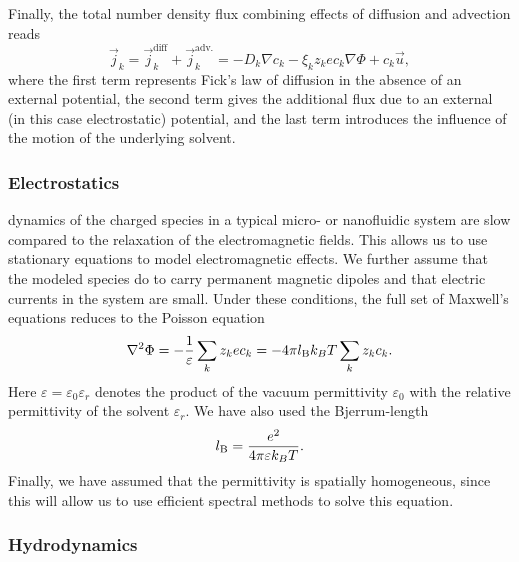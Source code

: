 Finally, the total number density flux combining effects of diffusion and advection reads
%
\begin{equation}
\label{eq:model_fluxes}
\vec{j}_{k} = \vec{j}_{k}^{\mathrm{diff}} + \vec{j}_{k}^{\mathrm{adv.}} = -D_{k} \nabla c_{k} - \xi_{k} z_{k} e c_{k} \nabla \Phi + c_{k} \vec{u} , 
\end{equation}
%
where the first term represents Fick's law of diffusion in the absence of an external potential, the second term gives the additional flux due to an external (in this case electrostatic) potential, and the last term introduces the influence of the motion of the underlying solvent.


\subsubsection{\label{sub:electrostatics}Electrostatics}

dynamics of the charged species in a typical micro- or nanofluidic system are slow compared to the relaxation of the electromagnetic fields. This allows us to use stationary equations to model electromagnetic effects. We further assume that the modeled species do to carry permanent magnetic dipoles and that electric currents in the system are small. Under these conditions, the full set of Maxwell's equations reduces to the Poisson equation
%
\begin{equation}
\label{eq:model_poisson}
\nabla^2 \Phi = - \frac{1}{\varepsilon} \sum_{k} z_{k} e c_{k} = -4 \pi l_\mathrm{B} k_{B}T \sum_{k} z_{k} c_{k} . 
\end{equation}
%
Here $\varepsilon = \varepsilon_{0} \varepsilon_r$ denotes the product of the vacuum permittivity $\varepsilon_{0}$ with the relative permittivity of the solvent $\varepsilon_r$. We have also used the Bjerrum-length
%
\begin{equation}
\label{eq:lbjerr}
l_\mathrm{B} = \frac{e^{2}}{4 \pi \varepsilon k_{B}T}.
\end{equation}
%
Finally, we have assumed that the permittivity is spatially homogeneous, since this will allow us to use efficient spectral methods to solve this equation.


\subsubsection{\label{sub:momentum}Hydrodynamics}


